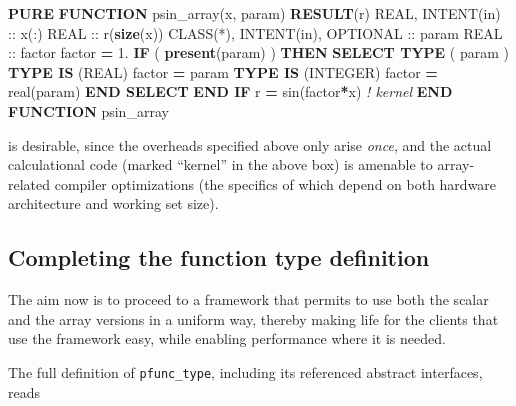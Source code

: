 \documentclass[
  paper=a4,
  ,captions=tableheading
]{scrartcl}
\newenvironment{Shaded}{\begin{snugshade}}{\end{snugshade}}
\newcommand{\BuiltInTok}[1]{#1}
\newcommand{\CommentTok}[1]{\textcolor[rgb]{0.56,0.35,0.01}{\textit{#1}}}
\newcommand{\DataTypeTok}[1]{\textcolor[rgb]{0.13,0.29,0.53}{#1}}
\newcommand{\FloatTok}[1]{\textcolor[rgb]{0.00,0.00,0.81}{#1}}
\newcommand{\FunctionTok}[1]{\textcolor[rgb]{0.13,0.29,0.53}{\textbf{#1}}}
\newcommand{\KeywordTok}[1]{\textcolor[rgb]{0.13,0.29,0.53}{\textbf{#1}}}
\newcommand{\NormalTok}[1]{#1}
\begin{document}
\begin{Shaded}
\begin{Highlighting}[]
\KeywordTok{PURE} \KeywordTok{FUNCTION}\NormalTok{ psin\_array(x, param) }\KeywordTok{RESULT}\NormalTok{(r)}
   \DataTypeTok{REAL}\NormalTok{, }\DataTypeTok{INTENT(in)} \DataTypeTok{::}\NormalTok{ x(:)}
   \DataTypeTok{REAL} \DataTypeTok{::}\NormalTok{ r(}\FunctionTok{size}\NormalTok{(x))}
   \DataTypeTok{CLASS(*)}\NormalTok{, }\DataTypeTok{INTENT(in)}\NormalTok{, }\DataTypeTok{OPTIONAL} \DataTypeTok{::}\NormalTok{ param}
   \DataTypeTok{REAL} \DataTypeTok{::}\NormalTok{ factor}
\NormalTok{   factor }\KeywordTok{=} \FloatTok{1.}
   \KeywordTok{IF}\NormalTok{ ( }\FunctionTok{present}\NormalTok{(param) ) }\KeywordTok{THEN}
      \KeywordTok{SELECT TYPE}\NormalTok{ ( param )}
      \KeywordTok{TYPE IS}\NormalTok{ (}\DataTypeTok{REAL}\NormalTok{)}
\NormalTok{         factor }\KeywordTok{=}\NormalTok{ param}
      \KeywordTok{TYPE IS}\NormalTok{ (}\DataTypeTok{INTEGER}\NormalTok{)}
\NormalTok{         factor }\KeywordTok{=} \DataTypeTok{real(param)}
      \KeywordTok{END SELECT}
   \KeywordTok{END IF}
\NormalTok{   r }\KeywordTok{=} \BuiltInTok{sin}\NormalTok{(factor}\KeywordTok{*}\NormalTok{x)  }\CommentTok{! kernel}
\KeywordTok{END FUNCTION}\NormalTok{ psin\_array}
\end{Highlighting}
\end{Shaded}

is desirable, since the overheads specified above only arise
\emph{once}, and the actual calculational code (marked ``kernel'' in the
above box) is amenable to array-related compiler optimizations (the
specifics of which depend on both hardware architecture and working set
size).

\subsection{Completing the function type
definition}\label{completing-the-function-type-definition}

The aim now is to proceed to a framework that permits to use both the
scalar and the array versions in a uniform way, thereby making life for
the clients that use the framework easy, while enabling performance
where it is needed.

The full definition of \texttt{pfunc\_type}, including its referenced
abstract interfaces, reads
\end{document}
